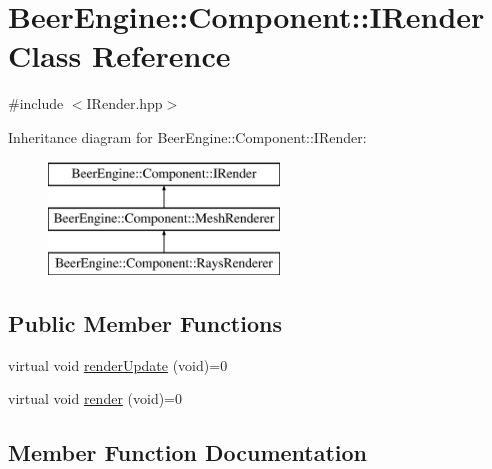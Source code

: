 \hypertarget{class_beer_engine_1_1_component_1_1_i_render}{}\section{Beer\+Engine\+:\+:Component\+:\+:I\+Render Class Reference}
\label{class_beer_engine_1_1_component_1_1_i_render}


{\ttfamily \#include $<$I\+Render.\+hpp$>$}

Inheritance diagram for Beer\+Engine\+:\+:Component\+:\+:I\+Render\+:\begin{figure}[H]
\begin{center}
\leavevmode
\includegraphics[height=3.000000cm]{class_beer_engine_1_1_component_1_1_i_render}
\end{center}
\end{figure}
\subsection*{Public Member Functions}
\begin{DoxyCompactItemize}
\item 
virtual void \mbox{\hyperlink{class_beer_engine_1_1_component_1_1_i_render_aef1ff4ddcdf216d290c747edd86bd99e}{render\+Update}} (void)=0
\item 
virtual void \mbox{\hyperlink{class_beer_engine_1_1_component_1_1_i_render_a021864acc1288b34b13f8766735ebcc0}{render}} (void)=0
\end{DoxyCompactItemize}


\subsection{Member Function Documentation}
\mbox{\label{class_beer_engine_1_1_component_1_1_i_render_a021864acc1288b34b13f8766735ebcc0}} 
